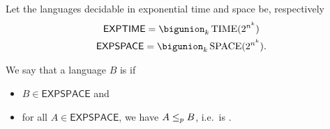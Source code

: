 \documentclass{standalone}
\begin{document}
  \begin{definition}
    Let the languages decidable in exponential time and space be, respectively
    \begin{gather*}
      \mathsf{EXPTIME} = \bigunion_k \TIME(2^{n^k}) \\
      \mathsf{EXPSPACE} = \bigunion_k \SPACE(2^{n^k}).
    \end{gather*}
  \end{definition}

  \begin{definition}
    We say that a language \(B\) is  if
    \begin{itemize}
      \item \(B \in \mathsf{EXPSPACE}\) and
      \item for all \(A \in \mathsf{EXPSPACE}\),
            we have \(A \mathrel{\leq_p} B\),
            i.e.\ is .
  \end{itemize}
\end{definition}
\end{document}
